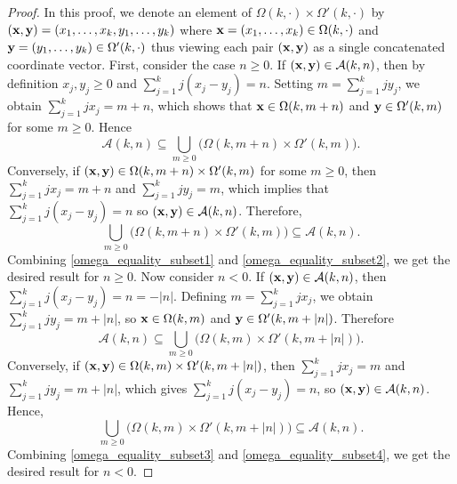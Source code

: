 \documentclass[11pt,oneside,reqno]{amsart}
\theoremstyle{definition}
\theoremstyle{remarkstyle}
\begin{document}
\begin{proof}
In this proof, we denote an element of $\Omega(k,\cdot)\times\Omega'(k,\cdot)$ by $({\bf x},{\bf y})=(x_1,\dots,x_k,y_1,\dots,y_k)$ where ${\bf x}=(x_1,\dots,x_k)\in\Omega(k,\cdot)$ and ${\bf y}=(y_1,\dots,y_k)\in\Omega'(k,\cdot)$ thus viewing each pair $({\bf x},{\bf y})$ as a single concatenated coordinate vector. 
First, consider the case $n\ge 0$.  
If $({\bf x},{\bf y})\in\mathcal A(k,n)$, then by definition $x_j,y_j\ge0$ and $\sum_{j=1}^k j(x_j-y_j)=n$.  
Setting $m=\sum_{j=1}^k jy_j$, we obtain $\sum_{j=1}^k jx_j=m+n$, which shows that  
${\bf x}\in\Omega(k,m+n)$ and ${\bf y}\in\Omega'(k,m)$ for some $m\ge 0$. Hence
\begin{equation}\label{omega_equality_subset1}
\mathcal A(k,n)\subseteq \bigcup_{m\ge0}\big(\Omega(k,m+n)\times\Omega'(k,m)\big).
\end{equation}
Conversely, if $({\bf x},{\bf y})\in\Omega(k,m+n)\times\Omega'(k,m)$ for some $m\ge0$, then  
$\sum_{j=1}^k jx_j=m+n$ and $\sum_{j=1}^k jy_j=m$, which implies that  
$\sum_{j=1}^k j(x_j-y_j)=n$ so $({\bf x},{\bf y})\in\mathcal A(k,n)$. Therefore,
\begin{equation}\label{omega_equality_subset2}
\bigcup_{m\ge0}\big(\Omega(k,m+n)\times\Omega'(k,m)\big)\subseteq \mathcal A(k,n).
\end{equation}
Combining \eqref{omega_equality_subset1} and \eqref{omega_equality_subset2}, we get the desired result for $n\ge0$. Now consider $n<0$.  
If $({\bf x},{\bf y})\in\mathcal A(k,n)$, then $\sum_{j=1}^k j(x_j-y_j)=n=-|n|$.  
Defining $m=\sum_{j=1}^k jx_j$, we obtain $\sum_{j=1}^k jy_j=m+|n|$, so  
${\bf x}\in\Omega(k,m)$ and ${\bf y}\in\Omega'(k,m+|n|)$. Therefore
\begin{equation}\label{omega_equality_subset3}
\mathcal A(k,n)\subseteq \bigcup_{m\ge0}\big(\Omega(k,m)\times\Omega'(k,m+|n|)\big).
\end{equation}
Conversely, if $({\bf x},{\bf y})\in\Omega(k,m)\times\Omega'(k,m+|n|)$, then  
$\sum_{j=1}^k jx_j=m$ and $\sum_{j=1}^k jy_j=m+|n|$, which gives  
$\sum_{j=1}^k j(x_j-y_j)=n$, so $({\bf x},{\bf y})\in\mathcal A(k,n)$. Hence,
\begin{equation}\label{omega_equality_subset4}
\bigcup_{m\ge0}\big(\Omega(k,m)\times\Omega'(k,m+|n|)\big)\subseteq \mathcal A(k,n).
\end{equation}
Combining \eqref{omega_equality_subset3} and \eqref{omega_equality_subset4}, we get the desired result for $n<0$.
\end{proof}
\end{document}
